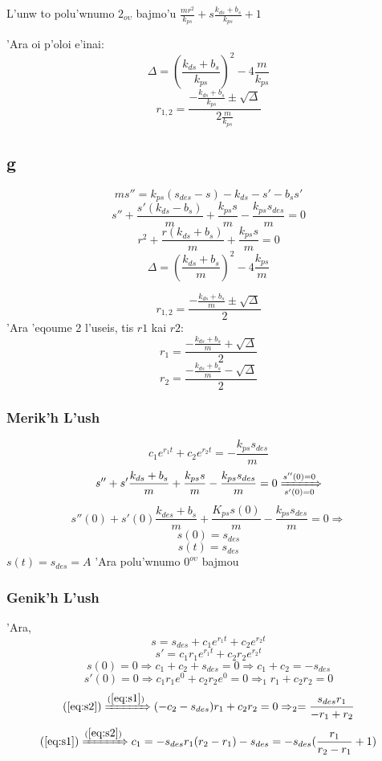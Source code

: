 \documentclass[a4paper]{article}
\begin{document}
        L'unw to polu'wnumo $2_{o\upsilon}$ bajmo'u $\frac{mr^2}{k_{ps}}+s\frac{k_{ds}+b_s}{k_{ps}}+1$ \par
        'Ara oi p'oloi e'inai:
        \[\Delta=(\frac{k_{ds}+b_s}{k_{ps}})^2-4\frac{m}{k_{ps}}\]
        \[r_{1,2}=\frac{-\frac{k_{ds}+b_s}{k_{ps}}\pm \sqrt{\Delta}}{2\frac{m}{k_{ps}}}\]

        \subsection{g}
        \[ms''=k_{ps}(s_{des}-s)-k_{ds}-s'-b_ss'\]
        \[s''+\frac{s'(k_{ds}-b_s)}{m}+\frac{k_{ps}s}{m}-\frac{k_{ps}s_{des}}{m}=0\]
        \[r^2+\frac{r(k_{ds}+b_s)}{m}+\frac{k_{ps}s}{m}=0\]
        \[\Delta=(\frac{k_{ds}+b_s}{m})^2-4\frac{k_{ps}}{m}\]
        
        \[r_{1,2}=\frac{-\frac{k_{ds}+b_s}{m}\pm\sqrt{\Delta}}{2}\]
        'Ara 'eqoume 2 l'useis, tis $r1$ kai $r2$:
        \[r_1=\frac{-\frac{k_{ds}+b_s}{m}+\sqrt{\Delta}}{2}\]
        \[r_2=\frac{-\frac{k_{ds}+b_s}{m}-\sqrt{\Delta}}{2}\]
        \subsubsection{Merik'h L'ush}
        \[c_1e^{r_1t}+c_2e^{r_2t}=-\frac{k_{ps}s_{des}}{m}\]
        \[s''+s'\frac{k_{ds}+b_s}{m}+\frac{k_{ps}s}{m}-\frac{k_{ps}s_{des}}{m}=0\xRightarrow[s'(0)=0]{s''(0)=0}\]
        \[s''(0)+s'(0)\frac{k_{des}+b_s}{m}+\frac{K_{ps}s(0)}{m}-\frac{k_{ps}s_{des}}{m}=0\Rightarrow\]
        \[s(0)=s_{des}\]
        \[s(t)=s_{des}\]
        $s(t)=s_{des}=A$ 'Ara polu'wnumo $0^{o\upsilon}$ bajmou
        \subsubsection{Genik'h L'ush}
        'Ara,
        \[s=s_{des}+c_1e^{r_1t}+c_2e^{r_2t}\]
        \[s'=c_1r_1e^{r_1t}+c_2r_2e^{r_2t}\]
        \begin{equation}
        s(0)=0\Rightarrow c_1+c_2+s_{des}=0\Rightarrow c_1+c_2=-s_{des}
        \label{eq:s1}
        \end{equation}
        \begin{equation}
            s'(0)=0\Rightarrow c_1r_1e^0+c_2r_2e^0=0\Rightarrow_1r_1+c_2r_2=0
            \label{eq:s2}
        \end{equation}
        \[(\ref{eq:s2})\xRightarrow{(\ref{eq:s1})}(-c_2-s_{des})r_1+c_2r_2=0\Rightarrow_2=\frac{s_{des}r_1}{-r_1+r_2}\]
        \[(\ref{eq:s1})\xRightarrow{(\ref{eq:s2})}c_1=-s_{des}r_1(r_2-r_1)-s_{des}=-s_{des}(\frac{r_1}{r_2-r_1}+1)\]
\end{document}
